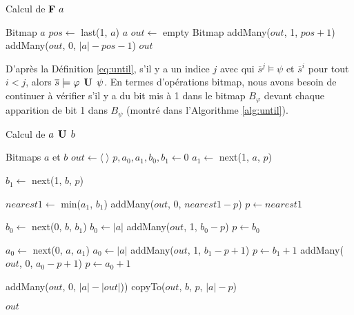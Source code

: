 \begin{algorithm}
\caption{Calcul de $\mathop{\mbox{\textbf{F}}}\, a$}
\label{alg:future}
\begin{algorithmic}[1]
\Require Bitmap $a$
\State $pos \gets$ last(1, $a$)
  \State \Return $a$
\Else
  \State $out \gets$ empty Bitmap
  \State addMany($out$, 1, $pos + 1$)
  \State addMany($out$, 0, $|a| - pos - 1$)
  \State \Return $out$
\EndIf
\end{algorithmic}
\end{algorithm}

D'après la Définition \eqref{eq:until}, s'il y a un indice $j$ avec qui $\overline{s}^j \models \psi$ et $\overline{s}^i$ pour tout $i < j$, alors $\overline{s} \models \varphi\mathrel{\mbox{\,\textbf{U}}}\,\psi$. En termes d'opérations bitmap, nous avons besoin de continuer à vérifier s'il y a du bit mis à 1 dans le bitmap $B_{\varphi}$ devant chaque apparition de bit 1 dans $B_{\psi}$ (montré dans l'Algorithme \ref{alg:until}).

\begin{algorithm}
\caption{Calcul de $a \mathrel{\mbox{\,\textbf{U}}}\, b$}
\label{alg:until}
\begin{multicols}{2}
\begin{algorithmic}[1]
\Require Bitmaps $a$ et $b$
\State $out \gets \langle~\rangle$
\State $p, a_0, a_1, b_0, b_1 \gets 0$
    \State $a_1 \gets$ next(1, $a$, $p$)
  \EndIf

    \State $b_1 \gets$ next(1, $b$, $p$)
  \EndIf

    \BreakWhile
  \EndIf

  \State $nearest1 \gets$ min($a_1$, $b_1$)
    \State addMany($out$, 0, $nearest1 - p$)
    \State $p \gets nearest1$
    \Continue
  \EndIf

      \State $b_0 \gets$ next(0, $b$, $b_1$)
        \State $b_0 \gets |a|$
      \EndIf
    \EndIf
    \State addMany($out$, 1, $b_0 - p$)
    \State $p \gets b_0$
    \Continue
  \EndIf

    \State $a_0 \gets$ next(0, $a$, $a_1$)
      \State $a_0 \gets |a|$
    \EndIf
  \EndIf
    \State addMany($out$, 1, $b_1 - p + 1$)
    \State $p \gets b_1 + 1$
  \Else
    \State addMany($out$, 0, $a_0 - p + 1$)
    \State $p \gets a_0 + 1$
  \EndIf
\EndWhile

  \State addMany($out$, 0, $|a| - |out|$))
  \State copyTo($out$, $b$, $p$, $|a| - p$)
\EndIf

\State \Return $out$
\end{algorithmic}
  \end{multicols}
\end{algorithm}

